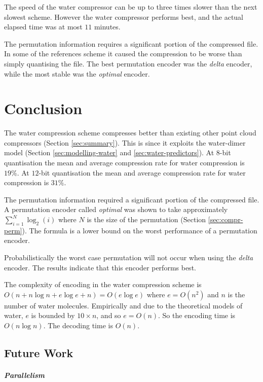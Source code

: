\documentclass[a4paper]{report}
\begin{document}
The speed of the water compressor can be up to three times slower than the
next slowest scheme. However the water compressor performs best, and the
actual elapsed time was at most $11$ minutes.

The permutation information requires a significant portion of the compressed
file. In some of the references scheme it caused the compression to be worse
than simply quantising the file. The best permutation encoder was the
\emph{delta} encoder, while the most stable was the \emph{optimal} encoder.



\chapter{Conclusion}

The water compression scheme compresses better than existing other point cloud
compressors (Section \ref{sec:summary}). This is since it exploits the
water-dimer model (Section \ref{sec:modelling-water} and
\ref{sec:water-predictors}). At $8$-bit quantisation the mean and average
compression rate for water compression is $19\%$. At $12$-bit quantisation the
mean and average compression rate for water compression is $31\%$.

The permutation information required a significant portion of the compressed
file. A permutation encoder called \emph{optimal} was shown to take
approximately $\sum^{N}_{i=1} \log_2(i)$ where $N$ is the size of the
permutation (Section \ref{sec:compr-perm}). The formula is a lower bound on
the worst performance of a permutation encoder.

Probabilistically the worst case permutation will not occur when using the
\emph{delta} encoder. The results indicate that this encoder performs best.

The complexity of encoding in the water compression scheme is $O(n + n \log n
+ e \log e + n) = O(e \log e)$ where $e = O(n^2)$ and $n$ is the number of
water molecules. Empirically and due to the theoretical models of water, $e$
is bounded by $10 \times n$, and so $e = O(n)$. So the encoding time is $O(n
\log n)$. The decoding time is $O(n)$.


\section{Future Work}

\paragraph{Parallelism}
\end{document}
